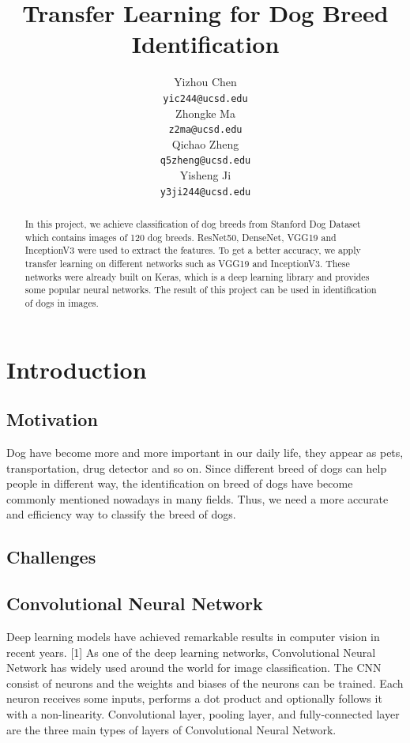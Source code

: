 \documentclass{article}
\title{Transfer Learning for Dog Breed Identification}
\author{%
  Yizhou Chen\\
  \texttt{yic244@ucsd.edu} \\
  \And
  Zhongke Ma\\
  \texttt{z2ma@ucsd.edu} \\
  \And
  Qichao Zheng\\
  \texttt{q5zheng@ucsd.edu} \\
  \And
  Yisheng Ji\\
  \texttt{y3ji244@ucsd.edu} \\
}
\begin{document}

\maketitle

\begin{abstract}
  In this project, we achieve classification of dog breeds from Stanford Dog Dataset which contains images of 120 dog breeds. ResNet50, DenseNet, VGG19 and InceptionV3 were used to extract the features. To get a better accuracy, we apply transfer learning on different networks such as VGG19 and InceptionV3. These networks were already built on Keras, which is a deep learning library and provides some popular neural networks. The result of this project can be used in identification of dogs in images.
\end{abstract}

\section{Introduction}

\subsection{Motivation}

Dog have become more and more important in our daily life, they appear as pets, transportation, drug detector and so on. Since different breed of dogs can help people in different way, the identification on breed of dogs have become commonly mentioned nowadays in many fields. Thus, we need a more accurate and efficiency way to classify the breed of dogs.

\subsection{Challenges}

\subsection{Convolutional Neural Network}

Deep learning models have achieved remarkable results in computer vision in recent years. [1] As one of the deep learning networks, Convolutional Neural Network has widely used around the world for image classification. The CNN consist of neurons and the weights and biases of the neurons can be trained. Each neuron receives some inputs, performs a dot product and optionally follows it with a non-linearity. Convolutional layer, pooling layer, and fully-connected layer are the three main types of layers of Convolutional Neural Network.
\end{document}
